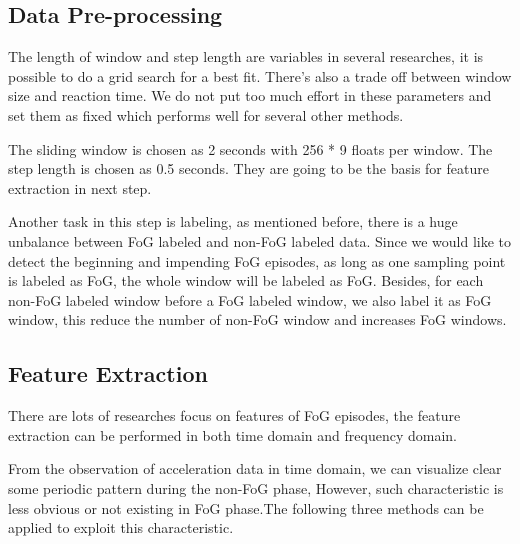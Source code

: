 \documentclass[article]{article}
\begin{document}
\subsection{Data Pre-processing}

The length of window and step length are variables in several researches, it is possible to do a grid search for a best fit. There's also a trade off between window size and reaction time. We do not put too much effort in these parameters and set them as fixed which performs well for several other methods.

The sliding window is chosen as 2 seconds with 256 * 9 floats per window. The step length is chosen as 0.5 seconds. They are going to be the basis for feature extraction in next step.

Another task in this step is labeling, as mentioned before, there is a huge unbalance between FoG labeled and non-FoG labeled data. Since we would like to detect the beginning and impending FoG episodes, as long as one sampling point is labeled as FoG, the whole window will be labeled as FoG. Besides, for each non-FoG labeled window before a FoG labeled window, we also label it as FoG window, this reduce the number of non-FoG window and increases FoG windows.     


\subsection{Feature Extraction}

There are lots of researches focus on features of FoG episodes, the feature extraction can be performed in both time domain and frequency domain. 
	
From the observation of acceleration data in time domain, we can visualize clear some periodic pattern during the non-FoG phase, However, such characteristic is less obvious or not existing in FoG phase.The following three methods can be applied to exploit this characteristic.
\end{document}
